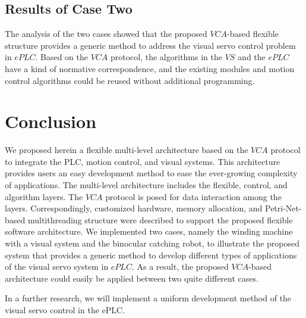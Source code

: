 \documentclass[journal,UTF8]{IEEEtran}
\begin{document}
	\subsection{Results of Case Two}
	The analysis of the two cases showed that the proposed $VCA$-based flexible structure provides a generic method to address the visual servo control problem in $ePLC$. Based on the $VCA$ protocol, the algorithms in the $VS$ and the $ePLC$ have a kind of normative correspondence, and the existing modules and motion control algorithms could be reused without additional programming. 
	\section{Conclusion}
	\label{conclusion}
	We proposed herein a flexible multi-level architecture based on the $VCA$ protocol to integrate the PLC, motion control, and visual systems. This architecture provides users an easy development method to ease the ever-growing complexity of applications. The multi-level architecture includes the flexible, control, and algorithm layers. The $VCA$ protocol is posed for data interaction among the layers. Correspondingly, customized hardware, memory allocation, and Petri-Net-based multithreading structure were described to support the proposed flexible software architecture. We implemented two cases, namely the winding machine with a visual system and the binocular catching robot, to illustrate the proposed system that provides a generic method to develop different types of applications of the visual servo system in $ePLC$. As a result, the proposed $VCA$-based architecture could easily be applied between two quite different cases.
	
	In a further research, we will implement a uniform development method of the visual servo control in the ePLC.
	
	\ifCLASSOPTIONcaptionsoff
	\newpage
	\fi
	
	
	
	
	
	
\end{document}

